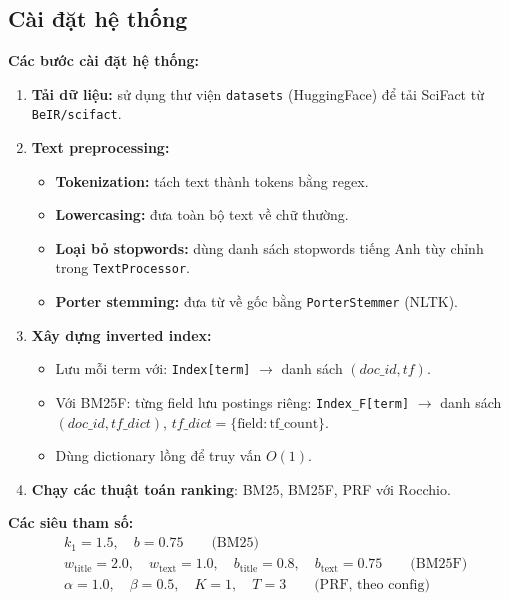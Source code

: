 \documentclass[12pt, a4paper]{article}
\begin{document}
\subsection{Cài đặt hệ thống}
\textbf{Các bước cài đặt hệ thống:}
\begin{enumerate}
    \item \textbf{Tải dữ liệu:} sử dụng thư viện \texttt{datasets} (HuggingFace) để tải SciFact từ \texttt{BeIR/scifact}.
    \item \textbf{Text preprocessing:}
        \begin{itemize}
            \item \textbf{Tokenization:} tách text thành tokens bằng regex.
            \item \textbf{Lowercasing:} đưa toàn bộ text về chữ thường.
            \item \textbf{Loại bỏ stopwords:} dùng danh sách stopwords tiếng Anh tùy chỉnh trong \texttt{TextProcessor}.
            \item \textbf{Porter stemming:} đưa từ về gốc bằng \texttt{PorterStemmer} (NLTK).
        \end{itemize}
    \item \textbf{Xây dựng inverted index:}
        \begin{itemize}
            \item Lưu mỗi term với: \texttt{Index[term]} $\rightarrow$ danh sách $(doc\_id, tf)$.
            \item Với BM25F: từng field lưu postings riêng: \texttt{Index\_F[term]} $\rightarrow$ danh sách $(doc\_id, tf\_dict)$, $tf\_dict = \{\text{field}: \text{tf\_count}\}$.
            \item Dùng dictionary lồng để truy vấn $O(1)$.
        \end{itemize}
    \item \textbf{Chạy các thuật toán ranking}: BM25, BM25F, PRF với Rocchio.
\end{enumerate}

\vspace{1em}
\textbf{Các siêu tham số:}
\begin{align*}
    &k_1 = 1.5,\quad b = 0.75 \qquad \text{(BM25)}\\
    &w_{\text{title}} = 2.0,\quad w_{\text{text}} = 1.0,\quad b_{\text{title}} = 0.8,\quad b_{\text{text}} = 0.75 \qquad \text{(BM25F)}\\
    &\alpha = 1.0,\quad \beta = 0.5,\quad K = 1,\quad T = 3 \qquad \text{(PRF, theo config)}
\end{align*}
\end{document}
